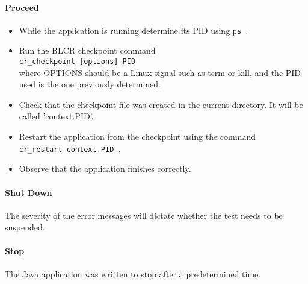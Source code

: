 \paragraph{Proceed}
\begin{itemize}
\item While the application is running determine its PID using {\tt ps }.
\item Run the BLCR checkpoint command\\
	{\tt cr\_checkpoint [options] PID}\\
	where OPTIONS should be a Linux signal such as term or kill, and the PID used is the one previously determined.
\item Check that the checkpoint file was created in the current directory. It will be called 'context.PID'.
\item Restart the application from the checkpoint using the command\\
	{\tt cr\_restart context.PID }.
\item Observe that the application finishes correctly.
\end{itemize}

\paragraph{Shut Down}
The severity of the error messages will dictate whether the test needs to be suspended.

\paragraph{Stop}
The Java application was written to stop after a predetermined time.
